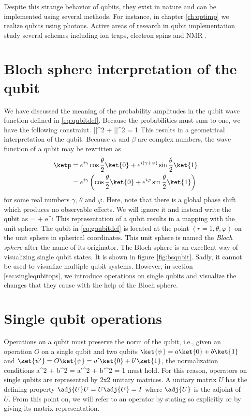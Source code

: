 Despite this strange behavior of qubits, they exist in nature and can be implemented using several methods. For instance, in chapter \ref{ch:optimp} we realize qubits using photons. Active areas of research in qubit implementation study several schemes including ion traps, electron spins and NMR \cite{nielsen2000}. 

\section{Bloch sphere interpretation of the qubit}
We have discussed the meaning of the probability amplitudes in the qubit wave function defined in \eqref{eq:qubitdef}. Because the probabilities must sum to one, we have the following constraint.
\beq
|\alpha|^2 + |\beta|^2 = 1
\eeq
This results in a geometrical interpretation of the qubit. Because $\alpha$ and $\beta$ are complex numbers, the wave function of a qubit may be rewritten as
\begin{align}
\ketp &= e^{i\gamma}\cos\frac{\theta}{2}\ket{0} + e^{i(\gamma + \varphi)}\sin\frac{\theta}{2}\ket{1}\\
&= e^{i\gamma}\left(\cos\frac{\theta}{2}\ket{0} + e^{i\varphi}\sin\frac{\theta}{2}\ket{1}\right)
\end{align}
for some real numbers $\gamma$, $\theta$ and $\varphi$. Here, note that there is a global phase shift which produces no observable effects. We will ignore it and instead write the qubit as
\beq
\label{eq:gqubitdef}
\ketp = \cos{} + e^{i\varphi}\sin{}
\eeq
{}
This representation of a qubit results in a mapping with the unit sphere. The qubit in \eqref{eq:gqubitdef} is located at the point $(r=1,\theta,\varphi)$ on the unit sphere in spherical coordinates. This unit sphere is named the \textit{Bloch sphere} after the name of its originator. The Bloch sphere is an excellent way of visualizing single qubit states. It is shown in figure \ref{fig:bsqubit}. Sadly, it cannot be used to visualize multiple qubit systems. However, in section \ref{sec:singlequbitops}, we introduce operations on single qubits and visualize the changes that they cause with the help of the Bloch sphere.

\section{Single qubit operations\label{sec:singlequbitops}}
Operations on a qubit must preserve the norm of the qubit, i.e., given an operation $O$ on a single qubit and two qubits $\ket{\psi} = a\ket{0} + b\ket{1}$ and $\ket{\psi'} = O\ket{\psi} = a'\ket{0} + b'\ket{1}$, the normalization conditions
\beq
a^2 + b^2 = a'^2 + b'^2 = 1
\eeq
must hold. For this reason, operators on single qubits are represented by 2x2 unitary matrices. A unitary matrix $U$ has the defining property $\adj{U}U = U\adj{U} = I$ where $\adj{U}$ is the adjoint of $U$. From this point on, we will refer to an operator by stating so explicitly or by giving its matrix representation.

